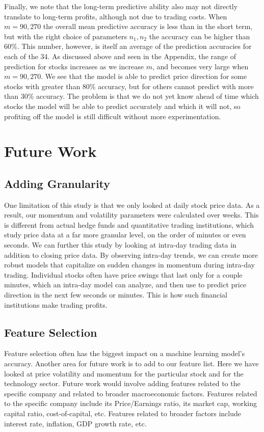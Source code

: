 \documentclass[pageno]{jpaper}
\begin{document}
Finally, we note that the long-term predictive ability also may not directly translate to long-term profits, although not due to trading costs. When $m=90, 270$ the overall mean predictive accuracy is less than in the short term, but with the right choice of parameters $n_1, n_2$ the accuracy can be higher than 60\%. This number, however, is itself an average of the prediction accuracies for each of the 34. As discussed above and seen in the Appendix, the range of prediction for stocks increases as we increase $m$, and becomes very large when $m=90, 270$. We see that the model is able to predict price direction for some stocks with greater than 80\% accuracy, but for others cannot predict with more than 30\% accuracy. The problem is that we do not yet know ahead of time which stocks the model will be able to predict accurately and which it will not, so profiting off the model is still difficult without more experimentation.

\section{Future Work}
\subsection{Adding Granularity}
One limitation of this study is that we only looked at daily stock price data. As a result, our momentum and volatility parameters were calculated over weeks. This is different from actual hedge funds and quantitative trading institutions, which study price data at a far more granular level, on the order of minutes or even seconds. We can further this study by looking at intra-day trading data in addition to closing price data. By observing intra-day trends, we can create more robust models that capitalize on sudden changes in momentum during intra-day trading. Individual stocks often have price swings that last only for a couple minutes, which an intra-day model can analyze, and then use to predict price direction in the next few seconds or minutes. This is how such financial institutions make trading profits.

\subsection{Feature Selection}
Feature selection often has the biggest impact on a machine learning model’s accuracy. Another area for future work is to add to our feature list. Here we have looked at price volatility and momentum for the particular stock and for the technology sector. Future work would involve adding features related to the specific company and related to broader macroeconomic factors. Features related to the specific company include its Price/Earnings ratio, its market cap, working capital ratio, cost-of-capital, etc. Features related to broader factors include interest rate, inflation, GDP growth rate, etc.
\end{document}
